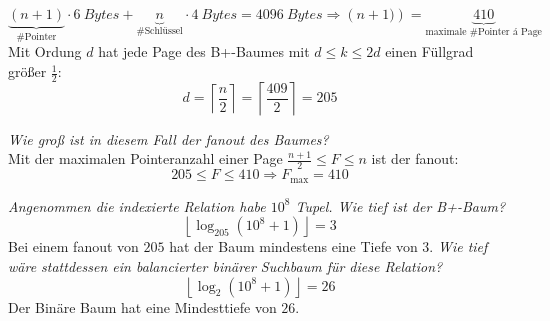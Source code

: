 \documentclass{uni_tue_template}
\begin{document}
    \[\underbrace{\left(n + 1\right)}_{\text{\# Pointer}} \cdot \SI{6}{Bytes} + \underbrace{n}_{\text{\# Schlüssel}} \cdot \SI{4}{Bytes} = \SI{4096}{Bytes}  \Rightarrow \left(n + 1)\right) = \underbrace{410}_{\text{maximale \# Pointer á Page}}\]
    Mit Ordung $d$ hat jede Page des B+-Baumes mit $d \leq k \leq 2d$ einen Füllgrad größer $\frac{1}{2}$: \[d = \left\lceil\frac{n}{2}\right\rceil = \left\lceil\frac{409}{2}\right\rceil = 205\]
  \item \emph{Wie groß ist in diesem Fall der fanout des Baumes?}\\
    Mit der maximalen Pointeranzahl einer Page $\frac{n+1}{2} \leq F \leq n$ ist der fanout: \[205 \leq F \leq 410 \Rightarrow F_{\text{max}} = 410\]
  \item \emph{Angenommen die indexierte Relation habe $10^8$ Tupel. Wie tief ist der B+-Baum?}
  \[\left\lfloor \log_{205}\left(10^8+1\right)\right\rfloor = 3\]
  Bei einem fanout von $205$ hat der Baum mindestens eine Tiefe von $3$.
  \emph{Wie tief wäre stattdessen ein balancierter binärer Suchbaum für diese Relation?}
    \[\left\lfloor \log_{2}\left(10^8+1\right)\right\rfloor = 26\]
    Der Binäre Baum hat eine Mindesttiefe von $26$.
\subExEnd{}
\end{document}
